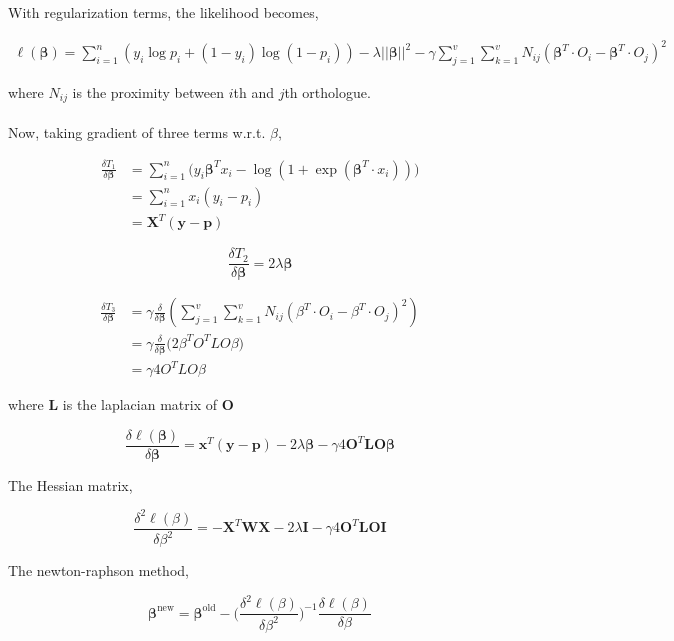 \documentclass[14 pt]{article}
\begin{document}
With regularization terms, the likelihood becomes,

\begin{eqnarray}
	\ell(\bm{\beta}) = \sum_{i=1}^{n} ( y_i \log p_i + (1-y_i) \log( 1- p_i ) ) - \lambda || \bm{\beta} ||^2 - \gamma \sum_{j = 1}^{v} \sum_{k = 1}^{v} N_{ij} ( \bm{\beta}^T \cdot O_i - \bm{\beta}^T \cdot O_j )^2
\end{eqnarray}

where $N_{ij}$ is the proximity between $i$th and $j$th orthologue.\\\\

Now, taking gradient of three terms w.r.t. $\beta$,

\begin{eqnarray}
	\frac{\delta T_1}{\delta \bm{\beta} } 
	&= \sum_{i=1}^n \biggl( y_i \bm{\beta}^T x_i - \log ( 1 + \exp ( \bm{\beta}^T\cdot x_i )) \biggl) \\
	&= \sum_{i=1}^n  x_i ( y_i - p_i ) \\
	&= \bm{X}^T ( \bm{y} - \bm{p})
\end{eqnarray}

\begin{equation}
	\frac{\delta T_2}{\delta \bm{\beta} } = 2 \lambda  \bm{\beta}
\end{equation}

\begin{eqnarray}
	\frac{ \delta T_3 } { \delta \bm{\beta}} &= \gamma \frac {\delta}{\delta \bm{\beta}} (\sum_{j = 1}^{v} \sum_{k = 1}^{v} N_{ij} ( \beta^T \cdot O_i - \beta^T \cdot O_j )^2 ) \\
	&= \gamma \frac {\delta}{\delta \bm{\beta}} \biggl(  2 \beta^T O^T L O \beta \biggl) \\
	&= \gamma 4 O^T L O \beta
\end{eqnarray}

where $\bm{L}$ is the laplacian matrix of $\bm{O}$
  
  \begin{equation}  
  \frac{\delta \ell ( \bm{\beta})}{\delta \bm{\beta}} = \bm{x}^T ( \bm{y} - \bm{p}) - 2 \lambda  \bm{\beta} - \gamma 4 \bm{O}^T \bm{L} \bm{O} \bm{\beta}
  \end{equation}
  
  The Hessian matrix,
  
  \begin{equation}
	  \frac{\delta^2 \ell (\beta)}{\delta \beta^2} = -\bm{X}^T \bm{W} \bm{X} - 2 \lambda  \bm{I} - \gamma 4 \bm{O}^T \bm{L} \bm{O}\bm{I} 
  \end{equation}
  
  The newton-raphson method,
  
  \begin{equation}
	  \bm{\beta}^\text{new} = \bm{\beta}^\text{old} - \bigg( \frac{\delta^2 \ell (\beta)}{\delta \beta^2} \bigg)^{-1} \frac{\delta \ell (\beta)}{\delta \beta} 
  \end{equation}
\end{document}

